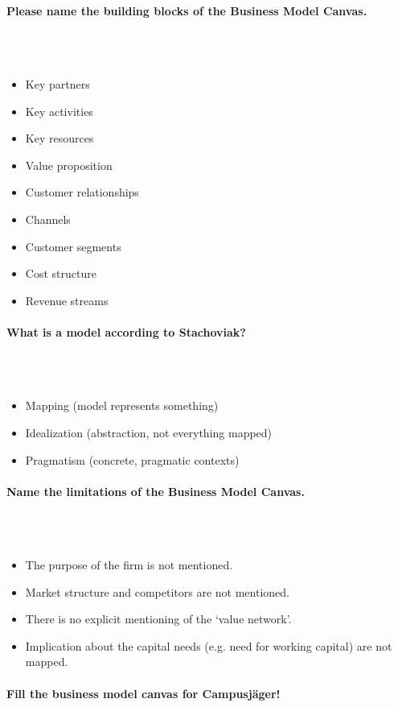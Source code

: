 \documentclass[10pt,a4paper,noendnumber=true]{scrartcl}
\newcommand{\properparagraph}[1]{\paragraph{\textcolor{Emerald}{#1}}\mbox{}\\}
\begin{document}
\properparagraph{Please name the building blocks of the Business Model Canvas.}
\\[-6ex]
\begin{itemize}
	\item Key partners
	\item Key activities
	\item Key resources
	\item Value proposition
	\item Customer relationships
	\item Channels
	\item Customer segments
	\item Cost structure
	\item Revenue streams
\end{itemize}


\properparagraph{What is a model according to Stachoviak?}
\\[-6ex]
\begin{itemize}
	\item Mapping (model represents something)
	\item Idealization (abstraction, not everything mapped)
	\item Pragmatism (concrete, pragmatic contexts)
\end{itemize}

\properparagraph{Name the limitations of the Business Model Canvas.}
\\[-6ex]
\begin{itemize}
	\item The purpose of the firm is not mentioned.
	\item Market structure and competitors are not mentioned.
	\item There is no explicit mentioning of the ‘value network’.
	\item Implication about the capital needs (e.g. need for working capital) are not mapped.
\end{itemize}

\properparagraph{Fill the business model canvas for Campusjäger!}
\begin{landscape}

\end{landscape}
\end{document}
